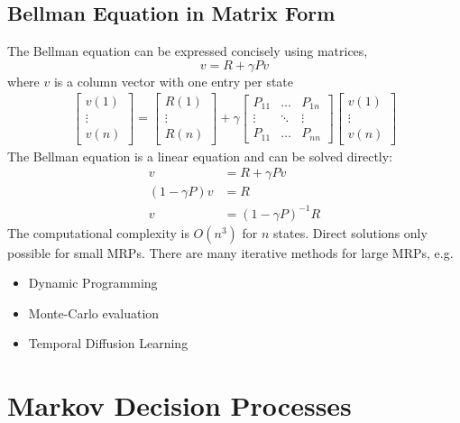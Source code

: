 \documentclass{article}
\begin{document}
\subsection{Bellman Equation in Matrix Form}
The Bellman equation can be expressed concisely using matrices,
$$ v = R + \gamma P v $$
where $v$ is a column vector with one entry per state
\begin{gather}
 \begin{bmatrix} v(1)  \\
                 \vdots  \\
                 v(n) 
 \end{bmatrix}
 =
  \begin{bmatrix} R(1)  \\
                 \vdots  \\
                 R(n) 
  \end{bmatrix}
+ \gamma 
  \begin{bmatrix}
   P_{11} & \dots &  P_{1n} \\
   \vdots & \ddots  & \vdots \\
   P_{11} & \dots & P_{nn}  
   \end{bmatrix}
    \begin{bmatrix} v(1)  \\
                 \vdots  \\
                 v(n) 
 \end{bmatrix}
\end{gather}
The Bellman equation is a linear equation and can be solved directly:
\begin{align*}
    v &= R + \gamma P v \\
    (1-\gamma P)v  &= R \\
    v &= (1-\gamma P)^{-1} R
\end{align*}
The computational complexity is $O(n^3)$ for $n$ states. Direct solutions only possible for small MRPs. There are many iterative methods for large MRPs, e.g.
\begin{itemize}
    \item Dynamic Programming
    \item Monte-Carlo evaluation
    \item Temporal Diffusion Learning 
\end{itemize}
\section{Markov Decision Processes}
\end{document}
